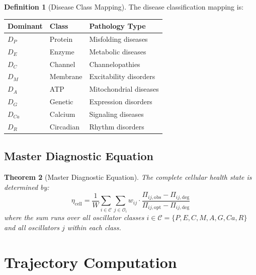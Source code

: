 \documentclass[10pt,twocolumn]{article}
\theoremstyle{plain}
\newtheorem{theorem}{Theorem}[section]
\theoremstyle{definition}
\newtheorem{definition}[theorem]{Definition}
\theoremstyle{remark}
\newcommand{\etacell}{\eta_{\mathrm{cell}}}
\begin{document}
\begin{definition}[Disease Class Mapping]
\label{def:class_mapping}
The disease classification mapping is:
\begin{center}
\begin{tabular}{@{}lll@{}}
\toprule
Dominant & Class & Pathology Type \\
\midrule
$D_P$ & Protein & Misfolding diseases \\
$D_E$ & Enzyme & Metabolic diseases \\
$D_C$ & Channel & Channelopathies \\
$D_M$ & Membrane & Excitability disorders \\
$D_A$ & ATP & Mitochondrial diseases \\
$D_G$ & Genetic & Expression disorders \\
$D_{Ca}$ & Calcium & Signaling diseases \\
$D_R$ & Circadian & Rhythm disorders \\
\bottomrule
\end{tabular}
\end{center}
\end{definition}

\subsection{Master Diagnostic Equation}

\begin{theorem}[Master Diagnostic Equation]
\label{thm:master}
The complete cellular health state is determined by:
\begin{equation}
\boxed{
\etacell = \frac{1}{W}\sum_{i \in \mathcal{C}} \sum_{j \in \mathcal{O}_i} w_{ij} \cdot \frac{\Pi_{ij,\mathrm{obs}} - \Pi_{ij,\mathrm{deg}}}{\Pi_{ij,\mathrm{opt}} - \Pi_{ij,\mathrm{deg}}}
}
\label{eq:master}
\end{equation}
where the sum runs over all oscillator classes $i \in \mathcal{C} = \{P, E, C, M, A, G, Ca, R\}$ and all oscillators $j$ within each class.
\end{theorem}

\section{Trajectory Computation}
\label{sec:trajectory}
\end{document}
